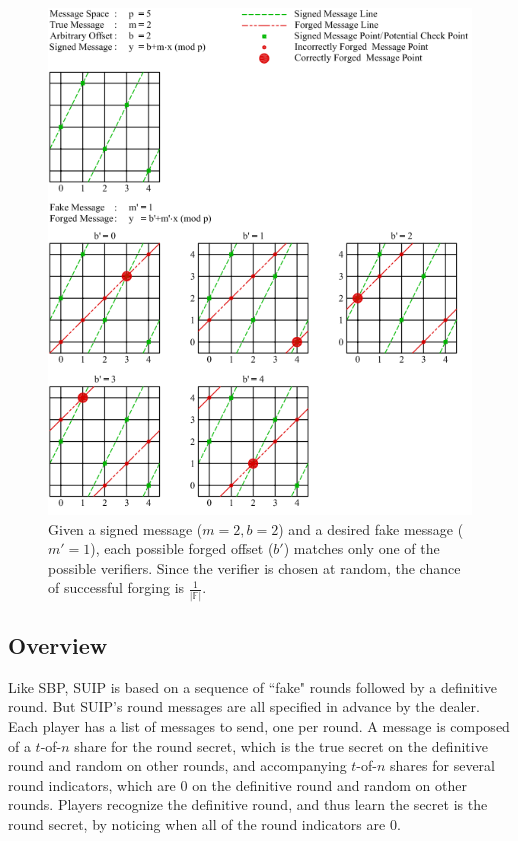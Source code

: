 \documentclass{dalcsthesis}
\begin{document}
\begin{figure}
\includegraphics[width=\textwidth]{../../Graphics/PointAndLineExample.png}
\caption{Given a signed message ($m=2, b=2$) and a desired fake message ($m'=1$), each possible forged offset ($b'$) matches only one of the possible verifiers. Since the verifier is chosen at random, the chance of successful forging is $\frac{1}{|\mathbb{F}|}$.}
\label{img:ForgingVerifiableMessageForUnbounded}
\end{figure}

\subsection{Overview}

Like SBP, SUIP is based on a sequence of ``fake" rounds followed by a definitive round. But SUIP's round messages are all specified in advance by the dealer. Each player has a list of messages to send, one per round. A message is composed of a $t$-of-$n$ share for the round secret, which is the true secret on the definitive round and random on other rounds, and accompanying $t$-of-$n$ shares for several round indicators, which are 0 on the definitive round and random on other rounds. Players recognize the definitive round, and thus learn the secret is the round secret, by noticing when all of the round indicators are 0.
\end{document}

